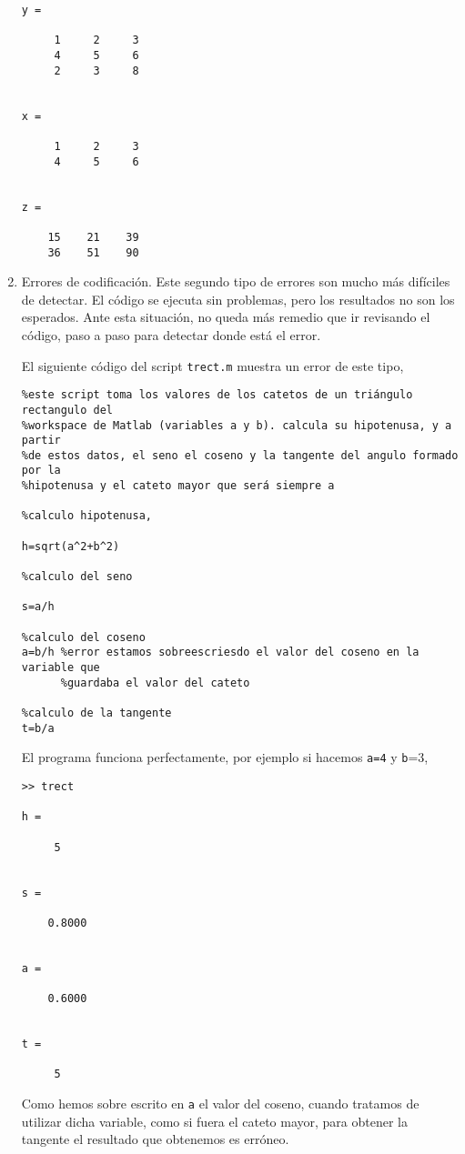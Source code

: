 \begin{enumerate}
\begin{verbatim}
y =

     1     2     3
     4     5     6
     2     3     8


x =

     1     2     3
     4     5     6


z =

    15    21    39
    36    51    90
\end{verbatim}

\item Errores de codificación. Este segundo tipo de errores son mucho más difíciles de detectar. El código se ejecuta sin problemas, pero los resultados no son los esperados. Ante esta situación, no queda más remedio que ir revisando el código, paso a paso para detectar donde está el error.

El siguiente código del script \texttt{trect.m} muestra un error de este tipo, 

\begin{verbatim}
%este script toma los valores de los catetos de un triángulo rectangulo del 
%workspace de Matlab (variables a y b). calcula su hipotenusa, y a partir
%de estos datos, el seno el coseno y la tangente del angulo formado por la
%hipotenusa y el cateto mayor que será siempre a

%calculo hipotenusa,

h=sqrt(a^2+b^2)

%calculo del seno

s=a/h

%calculo del coseno
a=b/h %error estamos sobreescriesdo el valor del coseno en la variable que 
      %guardaba el valor del cateto

%calculo de la tangente
t=b/a

\end{verbatim}

El programa funciona perfectamente, por ejemplo si hacemos \texttt{a=4} y \texttt{b}=3,

\begin{verbatim}
>> trect

h =

     5


s =

    0.8000


a =

    0.6000


t =

     5
\end{verbatim}
Como hemos sobre escrito en \texttt{a} el valor del coseno, cuando tratamos de utilizar dicha variable, como si fuera el cateto mayor, para obtener la tangente el resultado que obtenemos es erróneo.


\end{enumerate}
